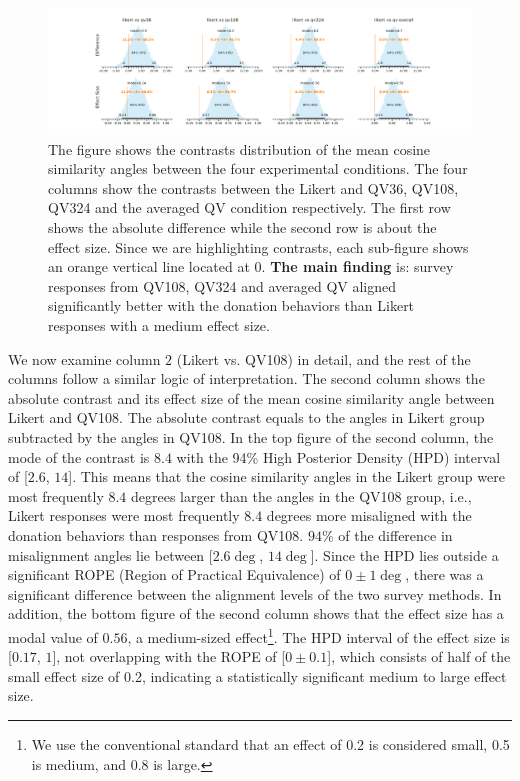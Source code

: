 \begin{figure}[htpb]
  \centering
  \includegraphics[trim= 2in 0in 2in 0in, clip, width=\textwidth, keepaspectratio=true]{"content/image/Votes_vs_Absolute_Donation_StudentT_differences_and_effects.pdf"}
  \caption{
    The figure shows the contrasts distribution of the mean cosine similarity angles between the four experimental conditions. The four columns show the contrasts between the Likert and QV36, QV108, QV324 and the averaged QV condition respectively. The first row shows the absolute difference while the second row is about the effect size. Since we are highlighting contrasts, each sub-figure shows an orange vertical line located at 0. \textbf{The main finding} is: survey responses from QV108, QV324 and averaged QV aligned significantly better with the donation behaviors than Likert responses with a medium effect size.
  }
  \label{fig:contrast_exp1}
\end{figure}

We now examine column $2$ (Likert vs. QV108) in detail, and the rest of the columns follow a similar logic of interpretation. The second column shows the absolute contrast and its effect size of the mean cosine similarity angle between Likert and QV108. The absolute contrast equals to the angles in Likert group subtracted by the angles in QV108. In the top figure of the second column, the mode of the contrast is $8.4$ with the 94\% High Posterior Density (HPD) interval of [$2.6$, $14$]. This means that the cosine similarity angles in the Likert group were most frequently $8.4$ degrees larger than the angles in the QV108 group, i.e., Likert responses were most frequently $8.4$ degrees more misaligned with the donation behaviors than responses from QV108. $94\%$ of the difference in misalignment angles lie between [$2.6 \deg$, $14 \deg$]. Since the HPD lies outside a significant ROPE (Region of Practical Equivalence) of $0 \pm 1 \deg$, there was a significant difference between the alignment levels of the two survey methods. In addition, the bottom figure of the second column shows that the effect size has a modal value of $0.56$, a medium-sized effect\footnote{We use the conventional standard that an effect of 0.2 is considered small, 0.5 is medium, and 0.8 is large.}. The HPD interval of the effect size is [$0.17$, $1$], not overlapping with the ROPE of [$0 \pm 0.1$], which consists of half of the small effect size of 0.2, indicating a statistically significant medium to large effect size.

